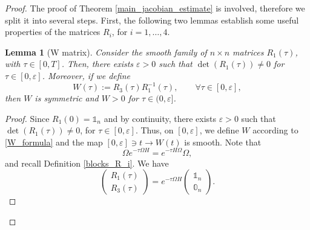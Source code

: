\documentclass[reqno]{amsart}
\theoremstyle{plain}
\newtheorem{lem}[thm]{Lemma}
\theoremstyle{definition}
\theoremstyle{remark}
\begin{document}
		\begin{proof}
			
		
		The proof of Theorem \ref{main_jacobian_estimate} is involved, therefore we split it into several steps. First, the following two lemmas establish some useful properties of the matrices $R_i$, for $i=1,\dots,4$.
		\begin{lem}[W matrix]\label{W_matrix}
			Consider the smooth family of $n\times n$ matrices $R_1(\tau)$, with $\tau\in[0,T]$. Then, there exists $\varepsilon>0$ such that $\det(R_1(\tau))\neq 0$ for $\tau\in[0,\varepsilon]$. Moreover, if we define
			\begin{equation}\label{W_formula}
				W(\tau):=R_3(\tau)R_1^{-1}(\tau),\qquad\forall \tau\in[0,\varepsilon],
			\end{equation}
			then $W$ is symmetric and $W>0$ for $\tau\in(0,\varepsilon]$.
		\end{lem}
		\begin{proof}
			Since $R_1(0)=\mathbb{1}_n$ and by continuity, there exists $\varepsilon>0$ such that $\det(R_1(\tau))\neq 0$, for $\tau\in[0,\varepsilon]$. Thus, on $[0,\varepsilon]$, we define  $W$ according to \eqref{W_formula} and the map $[0,\varepsilon]\ni t\to W(t)$ is smooth. Note that 
			\begin{equation}
				\Omega e^{-\tau\Omega H}=e^{-\tau H\Omega}\Omega,
			\end{equation}	
			and recall Definition \ref{blocks_R_i}. We have
			\begin{equation}
				\begin{pmatrix}
					R_1(\tau)\\ 
					R_3(\tau)
				\end{pmatrix}=e^{-\tau\Omega H}\begin{pmatrix}
					\mathbb{1}_n\\ 
					\mathbb{0}_n
				\end{pmatrix}.
			\end{equation}
			

\end{proof}
\end{proof}
\end{document}
